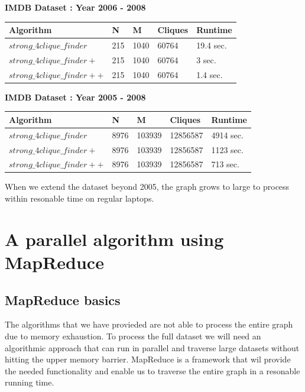 \documentclass{article}
\begin{document}
\textbf{IMDB Dataset : Year 2006 - 2008}
\begin{center}
    \begin{tabular}{ | l | l | l | l | l |}
    \hline
    Algorithm & N & M & Cliques & Runtime \\ \hline
    $strong\_4clique\_finder$ & 215 & 1040 & 60764 & 19.4 sec. \\ \hline
    $strong\_4clique\_finder+$ & 215 & 1040 & 60764 & 3 sec. \\ \hline
    $strong\_4clique\_finder++$ & 215 & 1040 & 60764 & 1.4 sec. \\ \hline
    \end{tabular}
\end{center}

\textbf{IMDB Dataset : Year 2005 - 2008}
\begin{center}
    \begin{tabular}{ | l | l | l | l | l |}
    \hline
    Algorithm & N & M & Cliques & Runtime \\ \hline
    $strong\_4clique\_finder$ & 8976 & 103939 & 12856587 & 4914 sec. \\ \hline
    $strong\_4clique\_finder+$ & 8976 & 103939 & 12856587 & 1123 sec.\\ \hline
    $strong\_4clique\_finder++$ & 8976 & 103939 & 12856587 & 713 sec. \\ \hline
    \end{tabular}
\end{center}

When we extend the dataset beyond 2005, the graph grows to large to process within resonable time on regular laptops.

\section{A parallel algorithm using MapReduce}

\subsection{MapReduce basics}
The algorithms that we have provieded are not able to process the entire graph due to memory exhaustion. To process the full dataset we will need an algorithmic approach that can run in parallel and traverse large datasets without hitting the upper memory barrier. MapReduce is a framework that wil provide the needed functionality and enable us to traverse the entire graph in a resonable running time.
\end{document}
